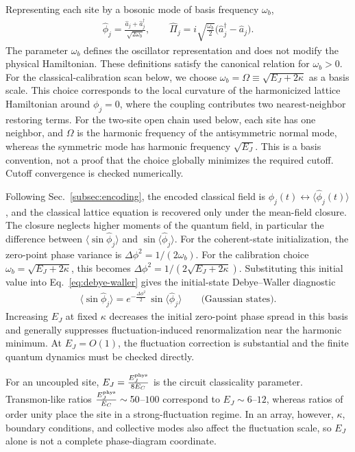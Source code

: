 \documentclass[pra,twocolumn,superscriptaddress,nofootinbib,floatfix]{revtex4-2}
\theoremstyle{remark}
\newcommand{\revcolor}{\color{blue}}
\DeclareRobustCommand{\rev}[1]{{\revcolor #1}}
\begin{document}
Representing each site by a bosonic mode of basis frequency $\omega_b$,
\begin{align}
\hat\phi_j = \tfrac{\hat a_j + \hat a_j^\dagger}{\sqrt{2\omega_b}},\qquad\hat\Pi_j = i\sqrt{\tfrac{\omega_b}{2}}\bigl(\hat a_j^\dagger - \hat a_j\bigr).
\label{eq:sg-quadratures}
\end{align}
The parameter \(\omega_b\) defines the oscillator representation and does not modify the physical Hamiltonian. These definitions satisfy the canonical relation for \(\omega_b>0\). \rev{For the classical-calibration scan below, we choose \(\omega_b=\Omega\equiv\sqrt{E_J+2\kappa}\) as a basis scale.} This choice corresponds to the local curvature of the harmonicized lattice Hamiltonian around \(\phi_j=0\), where the coupling contributes two nearest-neighbor restoring terms. \rev{For the two-site open chain used below, each site has one neighbor, and \(\Omega\) is the harmonic frequency of the antisymmetric normal mode, whereas the symmetric mode has harmonic frequency \(\sqrt{E_J}\).} This is a basis convention, not a proof that the choice globally minimizes the required cutoff. Cutoff convergence is checked numerically.

Following Sec.~\ref{subsec:encoding}, the encoded classical field is $\phi_j(t) \leftrightarrow \langle\hat\phi_j(t)\rangle$, and the classical lattice equation is recovered only under the mean-field closure. The closure neglects higher moments of the quantum field, in particular the difference between \(\langle\sin\hat\phi_j\rangle\) and \(\sin\langle\hat\phi_j\rangle\). For the coherent-state initialization, the zero-point phase variance is \(\Delta\phi^2 = 1/(2\omega_b).\) For the calibration choice \(\omega_b=\sqrt{E_J+2\kappa}\), this becomes \(\Delta\phi^2=1/(2\sqrt{E_J+2\kappa})\). \rev{Substituting this initial value into Eq.~\eqref{eq:debye-waller} gives the initial-state Debye--Waller diagnostic}
\begin{align}
\bigl\langle\sin\hat\phi_j\bigr\rangle= e^{-\tfrac{\Delta\phi^2}{2}}\,\sin\langle\hat\phi_j\rangle\qquad\text{(Gaussian states)}.
\label{eq:sg-dw}
\end{align}
Increasing \(E_J\) at fixed \(\kappa\) decreases the initial zero-point phase spread in this basis and generally suppresses fluctuation-induced renormalization near the harmonic minimum. At \(E_J=O(1)\), the fluctuation correction is substantial and the finite quantum dynamics must be checked directly.

For an uncoupled site, $E_J=\tfrac{E_J^{\rm phys}}{8E_C}$ is the circuit classicality parameter. Transmon-like ratios $\tfrac{E_J^{\rm phys}}{E_C}\sim50$--$100$ correspond to $E_J\sim6$--$12$, whereas ratios of order unity place the site in a strong-fluctuation regime. In an array, however, $\kappa$, boundary conditions, and collective modes also affect the fluctuation scale, so $E_J$ alone is not a complete phase-diagram coordinate.
\end{document}
